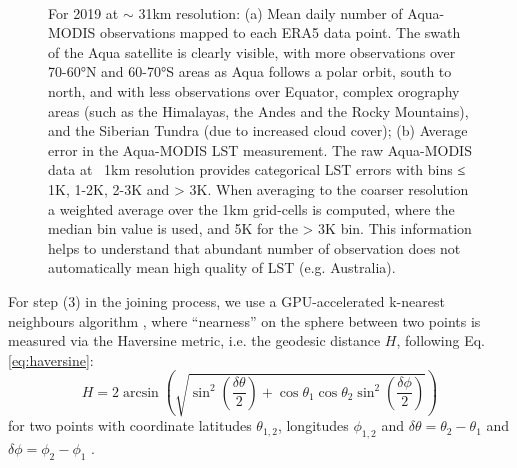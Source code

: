 \documentclass[hess, twostagejnl]{copernicus}
\begin{document}
\begin{figure}
	 \\
	\caption{For 2019 at $\sim$ 31km resolution: (a) Mean daily number of Aqua-MODIS observations mapped to each ERA5 data point. The swath of the Aqua satellite is clearly visible, with more observations over 70-60°N and 60-70°S areas as Aqua follows a polar orbit, south to north, and with less observations over Equator, complex orography areas (such as the Himalayas, the Andes and the Rocky Mountains), and the Siberian Tundra (due to increased cloud cover); (b) Average error in the Aqua-MODIS LST measurement. The raw Aqua-MODIS data at ~1km resolution provides categorical LST errors with bins ≤ 1K, 1-2K, 2-3K and > 3K. When averaging to the coarser resolution a weighted average over the 1km grid-cells is computed, where the median bin value is used, and 5K for the > 3K bin. This information helps to understand that abundant number of observation does not automatically mean high quality of LST (e.g. Australia).} 
	\label{fig:MODIS_time_error_N}
\end{figure}
\noindent For step (3) in the joining process, we use a GPU-accelerated k-nearest neighbours algorithm \cite{Rapids}, where “nearness” on the sphere between two points is measured via the Haversine metric, i.e. the geodesic distance $H$, following Eq. \ref{eq:haversine}:
\begin{equation}
	H = 2 \arcsin \left(\sqrt{\sin^2\left(\frac{\delta\theta}{2}\right) + \cos \theta_1 \cos \theta_2 \sin^2\left(\frac{\delta \phi}{2}\right) }\right)
	\label{eq:haversine}
\end{equation}
for two points with coordinate latitudes $\theta_{1,2}$, longitudes $\phi_{1,2}$ and $\delta \theta = \theta_2 - \theta_1$ and  $\delta \phi = \phi_2 - \phi_1$ . 
\end{document}
